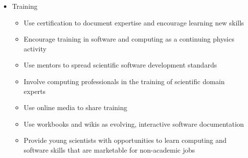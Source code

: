 \begin{itemize}
    \item Training
    \begin{itemize}
        \item Use certification to document expertise and encourage learning new skills
        \item Encourage training in software and computing as a continuing physics activity
        \item Use mentors to spread scientific software development standards
        \item Involve computing professionals in the training of scientific domain experts
        \item Use online media to share training
        \item Use workbooks and wikis as evolving, interactive software documentation
        \item Provide young scientists with opportunities to learn computing and software skills that are marketable for non-academic jobs
    \end{itemize}

\end{itemize}

